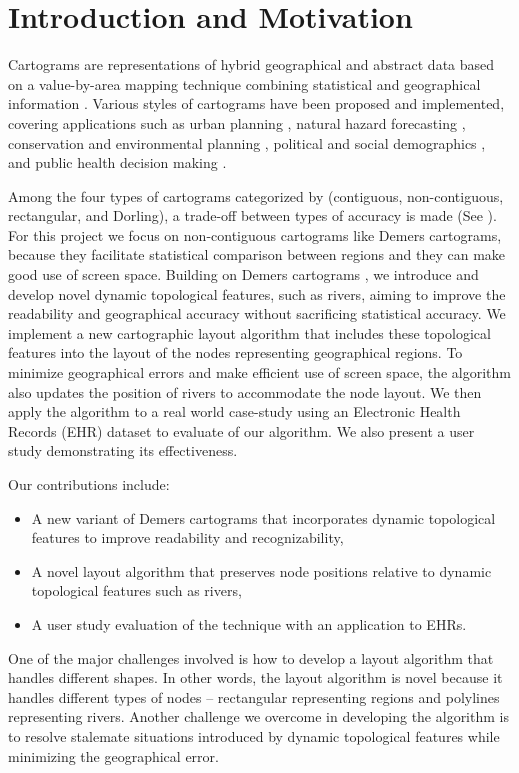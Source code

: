 \section{Introduction and Motivation}

Cartograms are representations of hybrid geographical and abstract data based on a value-by-area mapping technique combining statistical and geographical information \cite{dent2009Cartography}. Various styles of cartograms have been proposed and implemented, covering applications such as urban planning \cite{harris2018Mapping, arranz-lopez2021Enduser}, natural hazard forecasting \cite{pappenberger2019Cartograms, park2020Flood}, conservation and environmental planning \cite{galluzzi2018Mapping, rocchini2019Cartogramming}, political and social demographics \cite{breitzman2018Using, alieva2021How}, and public health decision making \cite{gao2020Visualising, sack2021Visualizing}.

Among the four types of cartograms categorized by  (contiguous, non-contiguous, rectangular, and Dorling), a trade-off between types of accuracy is made (See ). For this project we focus on non-contiguous cartograms like Demers cartograms, because they facilitate statistical comparison between regions and they can make good use of screen space. Building on Demers cartograms \cite{ian2002Cartogram}, we introduce and develop novel dynamic topological features, such as rivers, aiming to improve the readability and geographical accuracy without sacrificing statistical accuracy. We implement a new cartographic layout algorithm that includes these topological features into the layout of the nodes representing geographical regions. To minimize geographical errors and make efficient use of screen space, the algorithm also updates the position of rivers to accommodate the node layout. We then apply the algorithm to a real world case-study using an Electronic Health Records (EHR) dataset to evaluate of our algorithm. We also present a user study demonstrating its effectiveness.

Our contributions include:

\begin{itemize}
    \item A new variant of Demers cartograms that incorporates dynamic topological features to improve readability and recognizability,
    \item A novel layout algorithm that preserves node positions relative to dynamic topological features such as rivers,
    \item A user study evaluation of the technique with an application to EHRs.
\end{itemize}

One of the major challenges involved is how to develop a layout algorithm that handles different shapes. In other words, the layout algorithm is novel because it handles different types of nodes -- rectangular representing regions and polylines representing rivers. Another challenge we overcome in developing the algorithm is to resolve stalemate situations introduced by dynamic topological features while minimizing the geographical error.